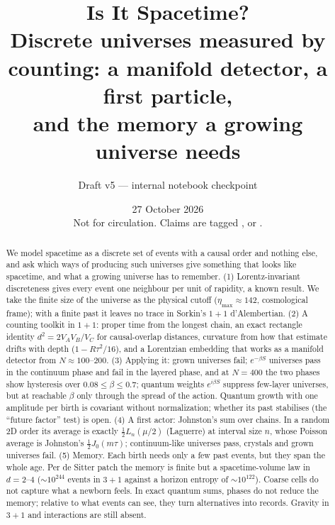 \documentclass[11pt,a4paper]{article}
\title{Is It Spacetime?\\[4pt]
\large Discrete universes measured by counting: a manifold detector, a first particle,\\ and the memory a growing universe needs}
\author{Draft v5 --- internal notebook checkpoint}
\date{27 October 2026\\[2pt]\small Not for circulation. Claims are tagged \est, \lit{} or \ours.}
\begin{document}
\maketitle

\begin{abstract}
We model spacetime as a discrete set of events with a causal order and nothing else, and ask which ways of producing such universes give something that looks like spacetime, and what a growing universe has to remember. (1) Lorentz-invariant discreteness gives every event one neighbour per unit of rapidity, a known result. We take the finite size of the universe as the physical cutoff ($\eta_{\max}\approx142$, cosmological frame); with a finite past it leaves no trace in Sorkin's $1+1$ d'Alembertian. (2) A counting toolkit in $1+1$: proper time from the longest chain, an exact rectangle identity $d^2=2V_AV_B/V_C$ for causal-overlap distances, curvature from how that estimate drifts with depth ($1-R\tau^2/16$), and a Lorentzian embedding that works as a manifold detector from $N\approx100$--$200$. (3) Applying it: grown universes fail; $e^{-\beta S}$ universes pass in the continuum phase and fail in the layered phase, and at $N=400$ the two phases show hysteresis over $0.08\le\beta\le0.7$; quantum weights $e^{i\beta S}$ suppress few-layer universes, but at reachable $\beta$ only through the spread of the action. Quantum growth with one amplitude per birth is covariant without normalization; whether its past stabilises (the ``future factor'' test) is open. (4) A first actor: Johnston's sum over chains. In a random 2D order its average is exactly $\tfrac12L_n(\mu/2)$ (Laguerre) at interval size $n$, whose Poisson average is Johnston's $\tfrac12J_0(m\tau)$; continuum-like universes pass, crystals and grown universes fail. (5) Memory. Each birth needs only a few past events, but they span the whole age. Per de Sitter patch the memory is finite but a spacetime-volume law in $d=2$--$4$ ($\sim10^{244}$ events in $3+1$ against a horizon entropy of $\sim10^{122}$). Coarse cells do not capture what a newborn feels. In exact quantum sums, phases do not reduce the memory; relative to what events can see, they turn alternatives into records. Gravity in $3+1$ and interactions are still absent.
\end{abstract}
\end{document}
